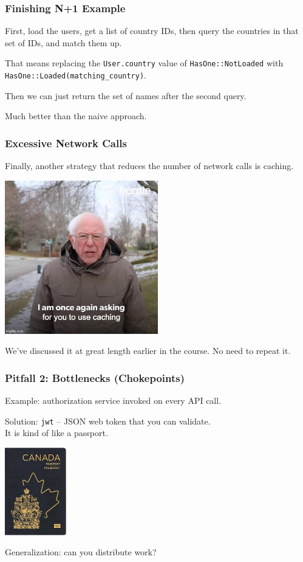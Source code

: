 \begin{frame}
\frametitle{Finishing N+1 Example}

First, load the users, get a list of country IDs, then query the countries in that set of IDs, and match them up. 

That means replacing the \texttt{User.country} value of \texttt{HasOne::NotLoaded} with \texttt{HasOne::Loaded(matching\_country)}. 

Then we can just return the set of names after the second query.

Much better than the naive approach.

\end{frame}

\begin{frame}
\frametitle{Excessive Network Calls}

Finally, another strategy that reduces the number of network calls is caching.

\begin{center}
	\includegraphics[width=0.5\textwidth]{images/bernie.jpg}
\end{center}

We've discussed it at great length earlier in the course. No need to repeat it.

\end{frame}


\begin{frame}
\frametitle{Pitfall 2: Bottlenecks (Chokepoints)}
Example: authorization service invoked on every API call.

Solution: \texttt{jwt} -- JSON web token that you can validate.\\
\quad It is kind of like a passport.

\begin{center}
	\includegraphics[width=0.2\textwidth]{images/passport.jpg}
\end{center}

Generalization: can you distribute work?

\end{frame}

